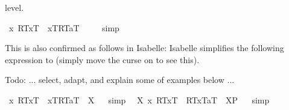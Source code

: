 \begin{isabellebody}
\begin{isamarkuptext}
 level.%
\end{isamarkuptext}%
\isamarkuptrue%
\isamarkupfalse%
\ {\isachardoublequoteopen}{\isacharbrackleft}{\isasymlparr}\isactrlbold {\isasymlambda}x{\isachardot}\ {\isasymlparr}R\isactrlsup T{\isacharcomma}x\isactrlsup T{\isasymrparr}\ \isactrlbold {\isasymrightarrow}\ {\isasymlbrace}x\isactrlsup T{\isacharcomma}R\isactrlsup T{\isasymrbrace}{\isacharcomma}a\isactrlsup T{\isasymrparr}{\isacharbrackright}\ {\isacharequal}\ {\isacharasterisk}{\isachardoublequoteclose}%
\isadelimproof
\ %
\endisadelimproof
%
\isatagproof
{}\isamarkupfalse%
\ simp\ \isamarkupfalse%
%
\endisatagproof
{\isafoldproof}%
%
\isadelimproof
%
\endisadelimproof
%
\begin{isamarkuptext}%
This is also confirmed as follows in Isabelle: Isabelle simplifies the following expression
 to  (simply move the curse on  to see this).%
\end{isamarkuptext}%
\isamarkuptrue%
%
\begin{isamarkuptext}%
Todo: ... select, adapt, and explain some of examples below ...%
\end{isamarkuptext}%
\isamarkuptrue%
\isamarkupfalse%
\ {\isachardoublequoteopen}{\isasymlparr}\isactrlbold {\isasymlambda}x{\isachardot}\ {\isasymlparr}R\isactrlsup T{\isacharcomma}x\isactrlsup T{\isasymrparr}\ \isactrlbold {\isasymrightarrow}\ {\isasymlbrace}x\isactrlsup T{\isacharcomma}R\isactrlsup T{\isasymrbrace}{\isacharcomma}a\isactrlsup T{\isasymrparr}\ {\isacharequal}\ X{\isachardoublequoteclose}%
\isadelimproof
\ %
\endisadelimproof
%
\isatagproof
{}\isamarkupfalse%
\ simp\ \isamarkupfalse%
%
\endisatagproof
{\isafoldproof}%
%
\isadelimproof
%
\endisadelimproof
\isanewline
\isanewline
{}\isamarkupfalse%
\ {\isachardoublequoteopen}{\isasymexists}X{\isachardot}\ {\isasymlparr}\isactrlbold {\isasymlambda}x{\isachardot}\ {\isasymlparr}R\isactrlsup T{\isacharcomma}x\isactrlsup T{\isasymrparr}\ \isactrlbold {\isasymrightarrow}\ {\isasymlparr}R\isactrlsup T{\isacharcomma}x\isactrlsup T{\isasymrparr}{\isacharcomma}a\isactrlsup T{\isasymrparr}\ {\isacharequal}\ {\isacharparenleft}X\isactrlsup P{\isacharparenright}{\isachardoublequoteclose}%
\isadelimproof
\ %
\endisadelimproof
%
\isatagproof
{}\isamarkupfalse%
\ simp\ \isamarkupfalse%
\ %
\end{isabellebody}
